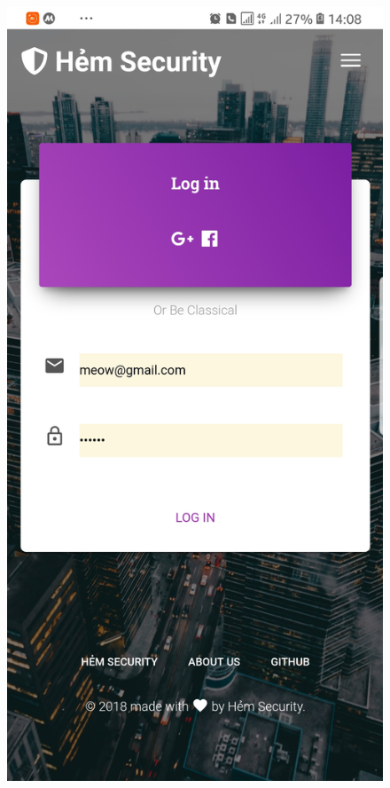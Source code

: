 \begin{figure}[!htb]
  \includegraphics[width=\linewidth]{images/chap4/signin_mb.jpg}
\endminipage\hfill
{}

\end{figure}
